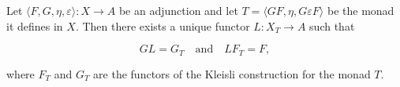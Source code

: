 Let $\langle F, G, \eta, \varepsilon \rangle : X \to A$ be an adjunction and let $T = \langle GF, \eta, G\varepsilon F \rangle$ be the monad it defines in $X$. Then there exists a unique functor $L : X_T \to A$ such that

$$G L = G_T \quad \text{and} \quad L F_T = F,$$

where $F_T$ and $G_T$ are the functors of the Kleisli construction for the monad $T$.
